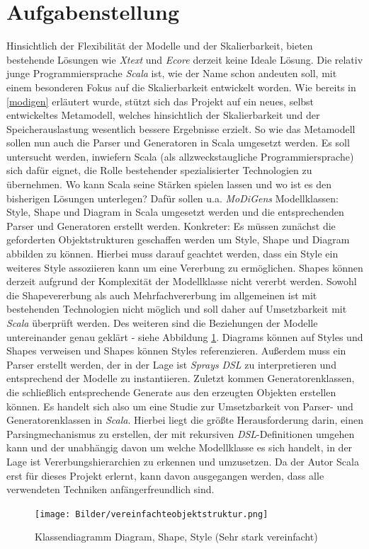 \section{Aufgabenstellung}
Hinsichtlich der Flexibilität der Modelle und der Skalierbarkeit, bieten bestehende Lösungen wie \textit{Xtext} und \textit{Ecore} derzeit keine Ideale Lösung. Die relativ junge Programmiersprache \textit{Scala} ist, wie der Name schon andeuten soll, mit einem besonderen Fokus auf die Skalierbarkeit entwickelt worden. Wie bereits in \ref{modigen} erläutert wurde, stützt sich das Projekt auf ein neues, selbst entwickeltes Metamodell, welches hinsichtlich der Skalierbarkeit und der Speicherauslastung wesentlich bessere Ergebnisse erzielt. So wie das Metamodell sollen nun auch die Parser und Generatoren in Scala umgesetzt werden. Es soll untersucht werden, inwiefern Scala (als allzweckstaugliche Programmiersprache) sich dafür eignet, die Rolle bestehender spezialisierter Technologien zu übernehmen. Wo kann Scala seine Stärken spielen lassen und wo ist es den bisherigen Lösungen unterlegen? Dafür sollen u.a. \textit{MoDiGens} Modellklassen: Style, Shape und Diagram in Scala umgesetzt werden und die entsprechenden Parser und Generatoren erstellt werden. Konkreter: Es müssen zunächst die geforderten Objektstrukturen geschaffen werden um Style, Shape und Diagram abbilden zu können. Hierbei muss darauf geachtet werden, dass ein Style ein weiteres Style assoziieren kann um eine Vererbung zu ermöglichen. Shapes können derzeit aufgrund der Komplexität der Modellklasse nicht vererbt werden. Sowohl die Shapevererbung als auch Mehrfachvererbung im allgemeinen ist mit bestehenden Technologien nicht möglich und soll daher auf Umsetzbarkeit mit \textit{Scala} überprüft werden. Des weiteren sind die Beziehungen der Modelle untereinander genau geklärt - siehe Abbildung \ref{diagramshapestyle}.
Diagrams können auf Styles und Shapes verweisen und Shapes können Styles referenzieren. Außerdem muss ein Parser erstellt werden, der in der Lage ist \textit{Sprays} \textit{DSL} zu interpretieren und entsprechend der Modelle zu instantiieren. Zuletzt kommen Generatorenklassen, die schließlich entsprechende Generate aus den erzeugten Objekten erstellen können. Es handelt sich also um eine Studie zur Umsetzbarkeit von Parser- und Generatorenklassen in \textit{Scala}. Hierbei liegt die größte Herausforderung darin, einen Parsingmechanismus zu erstellen, der mit rekursiven \textit{DSL}-Definitionen umgehen kann und der unabhängig davon um welche Modellklasse es sich handelt, in der Lage ist Vererbungshierarchien zu erkennen und umzusetzen. Da der Autor Scala erst für dieses Projekt erlernt, kann davon ausgegangen werden, dass alle verwendeten Techniken anfängerfreundlich sind.
\begin{figure}[h]
\begin{center}
\texttt{[image: Bilder/vereinfachteobjektstruktur.png]}
\caption{Klassendiagramm Diagram, Shape, Style (Sehr stark vereinfacht)}
\label{diagramshapestyle}
\end{center}
\end{figure}